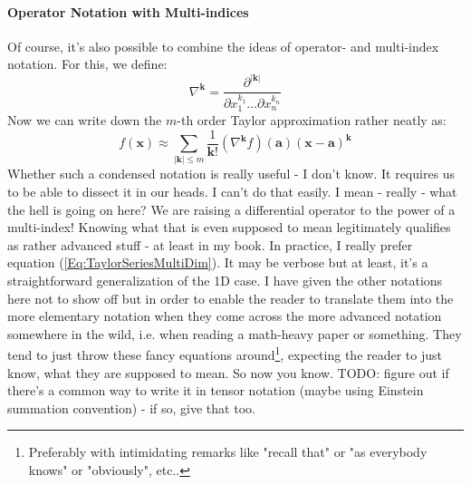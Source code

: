 \paragraph{Operator Notation with Multi-indices}
Of course, it's also possible to combine the ideas of operator- and multi-index notation. For this, we define:
\begin{equation}
\nabla ^ {\mathbf{k}} = \frac{\partial^{|\mathbf{k}|}}{\partial x_1^{k_1} \ldots \partial x_n^{k_n}}
\end{equation}
Now we can write down the $m$-th order Taylor approximation rather neatly as:
\begin{equation}
f(\mathbf{x}) \approx \sum_{|\mathbf{k}| \leq m} \frac{1}{\mathbf{k}!} 
                      (\nabla ^ {\mathbf{k}} f)(\mathbf{a})  (\mathbf{x - a})^{\mathbf{k}}
\end{equation}
Whether such a condensed notation is really useful - I don't know. It requires us to be able to dissect it in our heads. I can't do that easily. I mean - really - what the hell is going on here? We are raising a differential operator to the power of a multi-index! Knowing what that is even supposed to mean legitimately qualifies as rather advanced stuff - at least in my book. In practice, I really prefer equation (\ref{Eq:TaylorSeriesMultiDim}). It may be verbose but at least, it's a straightforward generalization of the 1D case. I have given the other notations here not to show off but in order to enable the reader to translate them into the more elementary notation when they come across the more advanced notation somewhere in the wild, i.e. when reading a math-heavy paper or something. They tend to just throw these fancy equations around\footnote{Preferably with intimidating remarks like "recall that" or "as everybody knows" or "obviously", etc..}, expecting the reader to just know, what they are supposed to mean. So now you know. TODO: figure out if there's a common way to write it in tensor notation (maybe using Einstein summation convention) - if so, give that too. %





